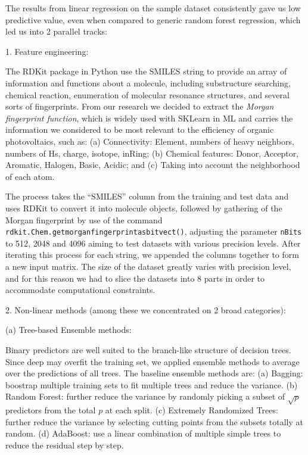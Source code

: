 \documentclass[11pt]{article}
\begin{document}
The results from linear regression on the sample dataset consistently gave us low predictive value, even when compared to generic random forest regression, which led us into 2 parallel tracks:


1. Feature engineering: 

The RDKit package in Python use the SMILES string to provide an array of information and functions about a molecule, including substructure searching, chemical reaction, enumeration of molecular resonance structures, and several sorts of fingerprints. From our research we decided to extract the \emph{Morgan fingerprint function}, which is widely used with SKLearn in ML and carries the information we considered to be most relevant to the efficiency of organic photovoltaics, such as: (a) Connectivity: Element, numbers of heavy neighbors, numbers of Hs, charge, isotope, inRing; (b) Chemical features: Donor, Acceptor, Aromatic, Halogen, Basic, Acidic; and (c) Taking into account the neighborhood of each atom.

The process takes the ``SMILES'' column from the training and test data and uses RDKit to convert it into molecule objects, followed by gathering of the Morgan fingerprint by use of the command \verb|rdkit.Chem.getmorganfingerprintasbitvect()|, adjusting the parameter \verb|nBits| to 512, 2048 and 4096 aiming to test datasets with various precision levels. After iterating this process for each string, we appended the columns together to form a new input matrix. The size of the dataset greatly varies with precision level, and for this reason we had to slice the datasets into 8 parts in order to accommodate computational constraints.

2. Non-linear methods (among these we concentrated on 2 broad categories):


(a) Tree-based Ensemble methods: 

Binary predictors are well suited to the branch-like structure of decision trees. Since deep may overfit the training set, we applied ensemble methods to average over the predictions of all trees. The baseline ensemble methods are: (a) Bagging: boostrap multiple training sets to fit multiple trees and reduce the variance. (b) Random Forest: further reduce the variance by randomly picking a subset of $\sqrt{p}$ predictors from the total $p$ at each split. (c) Extremely Randomized Trees: further reduce the variance by selecting cutting points from the subsets totally at random. (d) AdaBoost: use a linear combination of multiple simple trees to reduce the residual step by step.
\end{document}
